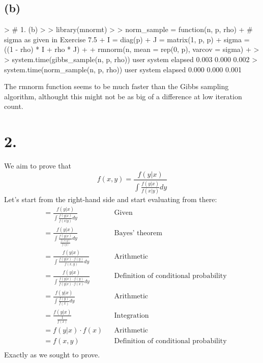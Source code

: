 \documentclass{article}
\begin{document}
{\subsection*{(b)}

\begin{spverbatim}
> # 1. (b)
> 
> library(mnormt)
> 
> norm_sample = function(n, p, rho) {
+   # sigma as given in Exercise 7.5
+   I = diag(p)
+   J = matrix(1, p, p)
+   sigma = ((1 - rho) * I + rho * J)
+   
+   rmnorm(n, mean = rep(0, p), varcov = sigma)
+ }
> 
> system.time(gibbs_sample(n, p, rho))
   user  system elapsed 
  0.003   0.000   0.002 
> system.time(norm_sample(n, p, rho))
   user  system elapsed 
  0.000   0.000   0.001 
\end{spverbatim}
The rmnorm function seems to be much faster than the Gibbs sampling algorithm, althought this might not be as big of a difference at low iteration count.

}
{\Large 

\section*{2.}

We aim to prove that
\[ 
  f(x, y) = \frac{f(y | x)}{\int \frac{f(y |x)}{f(x | y)} dy} 
\]
Let's start from the right-hand side and start evaluating from there:
\begin{align*}
  &= \frac{f(y | x)}{\int \frac{f(y |x)}{f(x | y)} dy} && \text{Given} \\
  &= \frac{f(y | x)}{\int \frac{f(y |x)}{\frac{f(x,y)}{f(y)}} dy} && \text{Bayes' theorem} \\
  & = \frac{f(y | x)}{\int \frac{f(y |x) \cdot f(y)}{f(x,y)} dy} && \text{Arithmetic} \\
  &= \frac{f(y | x)}{\int \frac{f(y | x) \cdot f(y)}{f(y | x) \cdot f(x)} dy} && \text{Definition of conditional probability} \\
  &= \frac{f(y | x)}{\int \frac{f(y)}{f(x)} dy} && \text{Arithmetic} \\
  &= \frac{f(y | x)}{\frac{1}{f(x)}} && \text{Integration} \\
  &= f(y | x) \cdot f(x) && \text{Arithmetic} \\
  &= f(x, y) && \text{Definition of conditional probability} \\
\end{align*}
Exactly as we sought to prove.

}
\end{document}
